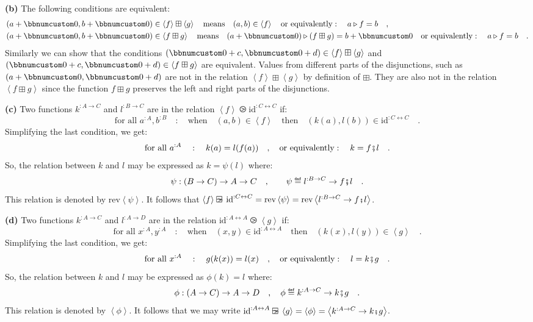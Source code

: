 \textbf{(b)} The following conditions are equivalent:
\begin{align*}
 & (a+\bbnum 0,b+\bbnum 0)\in\left<f\right>\boxplus\left<g\right>\quad\text{means}\quad(a,b)\in\left<f\right>\quad\text{or equivalently}:\quad a\triangleright f=b\quad,\\
 & (a+\bbnum 0,b+\bbnum 0)\in\left<f\boxplus g\right>\quad\text{means}\quad(a+\bbnum 0)\triangleright(f\boxplus g)=b+\bbnum 0\quad\text{or equivalently}:\quad a\triangleright f=b\quad.
\end{align*}
Similarly we can show that the conditions $(\bbnum 0+c,\bbnum 0+d)\in\left<f\right>\boxplus\left<g\right>$
and $(\bbnum 0+c,\bbnum 0+d)\in\left<f\boxplus g\right>$ are equivalent.
Values from different parts of the disjunctions, such as $(a+\bbnum 0,\bbnum 0+d)$
are not in the relation $\left<f\right>\boxplus\left<g\right>$ by
definition of $\boxplus$. They are also not in the relation $\left<f\boxplus g\right>$
since the function $f\boxplus g$ preserves the left and right parts
of the disjunctions.

\textbf{(c)} Two functions $k^{:A\rightarrow C}$ and $l^{:B\rightarrow C}$
are in the relation $\left<f\right>\ogreaterthan\text{id}^{:C\leftrightarrow C}$
if:
\[
\text{for all }a^{:A},b^{:B}\quad:\quad\text{when}\quad(a,b)\in\left<f\right>\quad\text{then}\quad(k(a),l(b))\in\text{id}^{:C\leftrightarrow C}\quad.
\]
Simplifying the last condition, we get:
\[
\text{for all }a^{:A}\quad:\quad k(a)=l(f(a))\quad,\quad\text{or equivalently}:\quad k=f\bef l\quad.
\]
So, the relation between $k$ and $l$ may be expressed as $k=\psi(l)$
where:
\[
\psi:\left(B\rightarrow C\right)\rightarrow A\rightarrow C\quad,\quad\quad\psi\triangleq l^{:B\rightarrow C}\rightarrow f\bef l\quad.
\]
This relation is denoted by $\text{rev}\left<\psi\right>$. It follows
that $\left<f\right>\ogreaterthan\text{id}^{:C\leftrightarrow C}=\text{rev}\left<\psi\right>=\text{rev}\left<l^{:B\rightarrow C}\rightarrow f\bef l\right>$.

\textbf{(d)} Two functions $k^{:A\rightarrow C}$ and $l^{:A\rightarrow D}$
are in the relation $\text{id}^{:A\leftrightarrow A}\ogreaterthan\left<g\right>$
if:
\[
\text{for all }x^{:A},y^{:A}\quad:\quad\text{when}\quad(x,y)\in\text{id}^{:A\leftrightarrow A}\quad\text{then}\quad(k(x),l(y))\in\left<g\right>\quad.
\]
Simplifying the last condition, we get:
\[
\text{for all }x^{:A}\quad:\quad g(k(x))=l(x)\quad,\quad\text{or equivalently}:\quad l=k\bef g\quad.
\]
So, the relation between $k$ and $l$ may be expressed as $\phi(k)=l$
where:
\[
\phi:\left(A\rightarrow C\right)\rightarrow A\rightarrow D\quad,\quad\phi\triangleq k^{:A\rightarrow C}\rightarrow k\bef g\quad.
\]
This relation is denoted by $\left<\phi\right>$. It follows that
we may write $\text{id}^{:A\leftrightarrow A}\ogreaterthan\left<g\right>=\left<\phi\right>=\left<k^{:A\rightarrow C}\rightarrow k\bef g\right>$.

